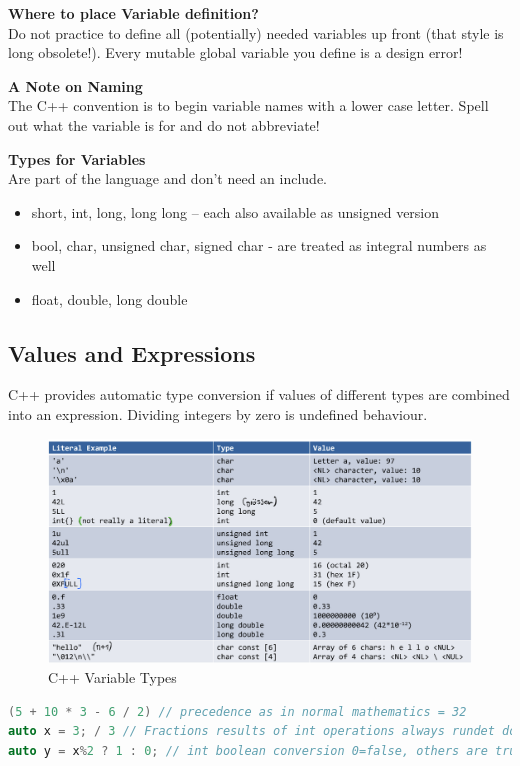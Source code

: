 \textbf{Where to place Variable definition?}\\
Do not practice to define all (potentially) needed variables up front (that style is long obsolete!). Every mutable global variable you define is a design error!

\textbf{A Note on Naming}\\
The C++ convention is to begin variable names with a lower case letter. Spell out what the variable is for and do not abbreviate!

\textbf{Types for Variables}\\
Are part of the language and don't need an include.
\begin{itemize}
  \itemsep -0.5em 
  \item  short, int, long, long long – each also available as unsigned version
  \item bool, char, unsigned char, signed char - are treated as integral numbers as well
  \item float, double, long double
\end{itemize}

\subsection{Values and Expressions}
C++ provides automatic type conversion if values of different types are combined into an expression. Dividing integers by zero is undefined behaviour.

\begin{figure}[h!]
	\centering
  \includegraphics[width=0.75\linewidth]{images/literalexamples}
  \caption{C++ Variable Types}
\end{figure}

\begin{lstlisting}[language=C++]
(5 + 10 * 3 - 6 / 2) // precedence as in normal mathematics = 32
auto x = 3; / 3 // Fractions results of int operations always rundet down! 1
auto y = x%2 ? 1 : 0; // int boolean conversion 0=false, others are true.=1
\end{lstlisting}

